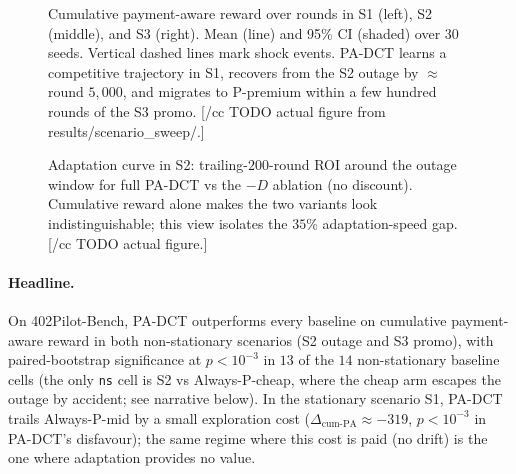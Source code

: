 \begin{figure}[t]
\centering
\fbox{\rule[-.5cm]{0cm}{4cm} \rule[-.5cm]{12cm}{0cm}}
\caption{Cumulative payment-aware reward over rounds in S1 (left), S2 (middle), and S3 (right). Mean (line) and 95\% CI (shaded) over $30$ seeds. Vertical dashed lines mark shock events. PA-DCT learns a competitive trajectory in S1, recovers from the S2 outage by $\approx$round $5{,}000$, and migrates to P-premium within a few hundred rounds of the S3 promo. [/cc TODO actual figure from results/scenario\_sweep/.]}
\label{fig:learning-curves}
\end{figure}

\begin{figure}[t]
\centering
\fbox{\rule[-.5cm]{0cm}{4cm} \rule[-.5cm]{8cm}{0cm}}
\caption{Adaptation curve in S2: trailing-$200$-round ROI around the outage window for full PA-DCT vs the $-D$ ablation (no discount). Cumulative reward alone makes the two variants look indistinguishable; this view isolates the $35\%$ adaptation-speed gap. [/cc TODO actual figure.]}
\label{fig:s2-adaptation}
\end{figure}

\paragraph{Headline.}
On 402Pilot-Bench, PA-DCT outperforms every baseline on cumulative payment-aware reward in both non-stationary scenarios (S2 outage and S3 promo), with paired-bootstrap significance at $p<10^{-3}$ in $13$ of the $14$ non-stationary baseline cells (the only \texttt{ns} cell is S2 vs Always-P-cheap, where the cheap arm escapes the outage by accident; see narrative below). In the stationary scenario S1, PA-DCT trails Always-P-mid by a small exploration cost ($\Delta_{\mathrm{cum\text{-}PA}} \approx -319$, $p<10^{-3}$ in PA-DCT's disfavour); the same regime where this cost is paid (no drift) is the one where adaptation provides no value.

